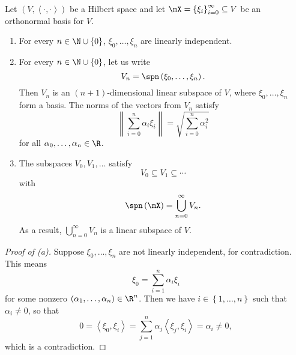 \documentclass[pmath450]{subfiles}
\begin{document}
    \begin{prop}{}
        Let $\left( V,\left\langle \cdot, \cdot\right\rangle \right)$ be a Hilbert space and let $\mX=\left\lbrace \xi_i \right\rbrace^{\infty}_{i=0}\subseteq V$ be an orthonormal basis for $V$.
        \begin{enumerate}
            \item For every $n\in\N\cup\left\lbrace 0 \right\rbrace$, $\xi_0,\ldots,\xi_n$ are linearly independent.
            \item For every $n\in\N\cup\left\lbrace 0 \right\rbrace$, let us write
                \begin{equation*}
                    V_n = \spn\left( \xi_0,\ldots,\xi_n \right).
                \end{equation*}
                Then $V_n$ is an $\left( n+1 \right)$-dimensional linear subspace of $V$, where $\xi_0,\ldots,\xi_n$ form a basis. The norms of the vectors from $V_n$ satisfy
                \begin{equation*}
                    \left\lVert \sum^{n}_{i=0}\alpha_i\xi_i\right\rVert = \sqrt{\sum^{n}_{i=0}\alpha_i^{2}}
                \end{equation*}
                for all $\alpha_0,\ldots,\alpha_n\in\R$.
            \item The subspaces $V_0,V_1,\ldots$ satisfy 
                \begin{equation*}
                    V_0\subseteq V_1\subseteq\cdots
                \end{equation*}
                with
                \begin{equation*}
                    \spn\left( \mX \right) = \bigcup^{\infty}_{n=0}V_n.
                \end{equation*}
                As a result, $\bigcup^{\infty}_{n=0}V_n$ is a linear subspace of $V$.
        \end{enumerate}
    \end{prop}
    
    \begin{proof}[Proof of (a)]
        Suppose $\xi_0,\ldots,\xi_n$ are not linearly independent, for contradiction. This means
        \begin{equation*}
            \xi_0 = \sum^{n}_{i=1}\alpha_i\xi_i
        \end{equation*}
        for some nonzero $\left( \alpha_1,\ldots,\alpha_n \right)\in\R^n$. Then we have $i\in\left\lbrace 1,\ldots,n \right\rbrace$ such that $\alpha_i\neq 0$, so that
        \begin{equation*}
            0 = \left\langle \xi_0, \xi_i\right\rangle = \sum^{n}_{j=1}\alpha_j\left\langle \xi_j, \xi_i\right\rangle = \alpha_i \neq 0,
        \end{equation*}
        which is a contradiction.
        \qedplacedtrue
    \end{proof}
\end{document}
